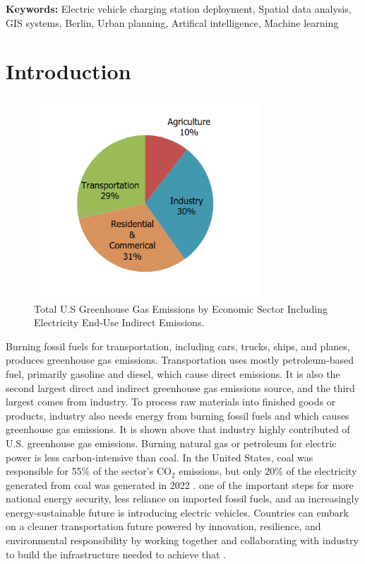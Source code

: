 \textbf{Keywords: }Electric vehicle charging station deployment, Spatial data analysis, GIS systems, Berlin, Urban planning, Artifical intelligence, Machine learning

\clearpage  

\section{Introduction}

\begin{figure}[hbt!]
\begin{center}
\includegraphics[width=0.75\textwidth]{Bilder/[1].png}
\caption{Total U.S Greenhouse Gas Emissions by Economic Sector Including Electricity End-Use Indirect Emissions. \cite{EPA_GHG}}\label{fig:[1]}
\end{center}
\end{figure}
Burning fossil fuels for transportation, including cars, trucks, ships, and planes, produces greenhouse gas emissions. Transportation uses mostly petroleum-based fuel, primarily gasoline and diesel, which cause direct emissions. It is also the second largest direct and indirect greenhouse gas emissions source, and the third largest comes from industry. To process raw materials into finished goods or products, industry also needs energy from burning fossil fuels and which causes greenhouse gas emissions. It is shown above that industry highly contributed of U.S. greenhouse gas emissions. Burning natural gas or petroleum for electric power is less carbon-intensive than coal. In the United States, coal was responsible for 55\% of the sector’s $\text{CO}_2$ emissions, but only 20\% of the electricity generated from coal was generated in 2022 \cite{EPA_GHG}. one of the important steps for more national energy security, less reliance on imported fossil fuels, and an increasingly energy-sustainable future is introducing electric vehicles. Countries can embark on a cleaner transportation future powered by innovation, resilience, and environmental responsibility by working together and collaborating with industry to build the infrastructure needed to achieve that \cite{Cyberswitching_Independence}. 
\\

